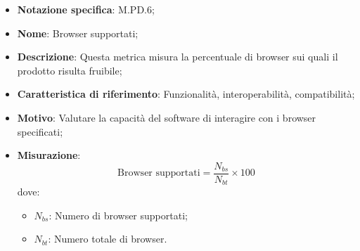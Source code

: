 \begin{itemize}
    \item \textbf{Notazione specifica}: M.PD.6;
    \item \textbf{Nome}: Browser supportati;
    \item \textbf{Descrizione}: Questa metrica misura la percentuale di browser sui quali il prodotto risulta fruibile;
    \item \textbf{Caratteristica di riferimento}: Funzionalità, interoperabilità, compatibilità;
    \item \textbf{Motivo}: Valutare la capacità del software di interagire con i browser specificati;
    \item \textbf{Misurazione}:
    \[
    \text{Browser supportati} = \frac{N_{bs}}{N_{bt}} \times 100
    \]
    dove:
    \begin{itemize}
        \item $N_{bs}$: Numero di browser supportati;
        \item $N_{bt}$: Numero totale di browser.
    \end{itemize}
\end{itemize}
